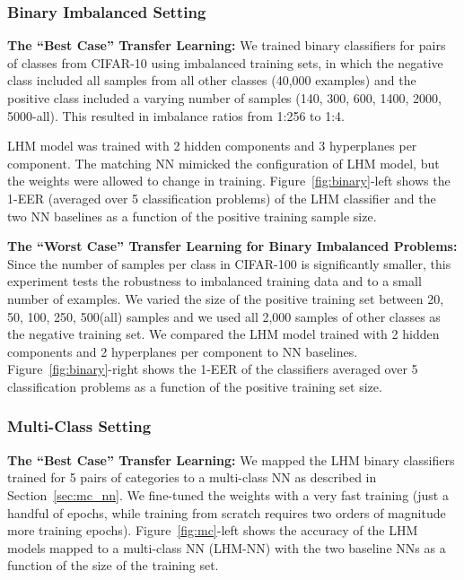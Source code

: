 \documentclass[twoside,11pt]{article}
\begin{document}
\subsubsection{Binary Imbalanced Setting}
\noindent\textbf{The ``Best Case'' Transfer Learning:}
We trained binary classifiers for pairs of classes from CIFAR-10 using imbalanced training sets, in which the negative class included all samples from all other classes (40,000 examples) and the positive class included a varying number of samples (140, 300, 600, 1400, 2000, 5000-all). This resulted in imbalance ratios from 1:256 to 1:4.

LHM model was trained with 2 hidden components and 3 hyperplanes per component. The matching NN mimicked the configuration of LHM model, but the weights were allowed to change in training.  Figure~\ref{fig:binary}-left shows the 1-EER (averaged over 5 classification problems) of the LHM classifier and the two NN baselines as a function of the positive training sample size.


\noindent\textbf{The ``Worst Case'' Transfer Learning for Binary Imbalanced Problems:}
Since the number of samples per class in CIFAR-100 is significantly smaller, this experiment tests the robustness to imbalanced training data and to a small number of examples. We varied the size of the positive training set between 20, 50, 100, 250, 500(all) samples and we used all 2,000 samples of other classes as the negative training set. We compared the LHM model trained with 2 hidden components and  2 hyperplanes per component to NN baselines. Figure~\ref{fig:binary}-right shows the 1-EER of the classifiers averaged over 5 classification problems as a function of the positive training set size.


\subsubsection{Multi-Class Setting}
\noindent\textbf{The ``Best Case'' Transfer Learning:}
We mapped the LHM binary classifiers trained for 5 pairs of categories to a multi-class NN as described in Section~\ref{sec:mc_nn}. We fine-tuned the weights with a very fast training (just a handful of epochs, while training from scratch requires two orders of magnitude more training epochs). Figure~\ref{fig:mc}-left shows the accuracy of the LHM models mapped to a multi-class NN (LHM-NN) with the two baseline NNs as a function of the size of the training set.
\end{document}
